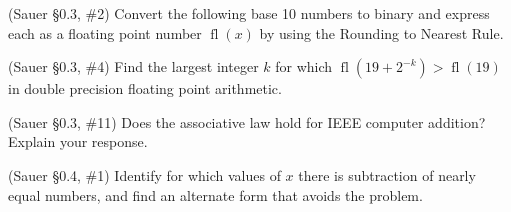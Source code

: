 \documentclass[12pt,fleqn]{exam}
\newcommand{\fl}{\ensuremath{\operatorname{fl}}}
\begin{document}
\begin{questions}
\question (Sauer \S0.3, \#2) Convert the following base 10 numbers to binary and express each as a floating point number $\fl(x)$ by using the Rounding to Nearest Rule.

\question (Sauer \S0.3, \#4) Find the largest integer $k$ for which $\fl(19 + 2^{-k}) > \fl(19)$ in double precision floating point arithmetic.

\question (Sauer \S0.3, \#11) Does the associative law hold for IEEE computer addition? Explain your response.

\question (Sauer \S0.4, \#1) Identify for which values of $x$ there is subtraction of nearly equal numbers, and find an alternate form that avoids the problem.


\end{questions}
\end{document}
